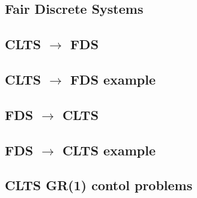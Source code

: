 \documentclass{article}
\begin{document}
\subsection{Fair Discrete Systems}


%

%

%

\subsection{CLTS $\rightarrow$ FDS}

\subsection{CLTS $\rightarrow$ FDS example}

%

\subsection{FDS $\rightarrow$ CLTS}


\subsection{FDS $\rightarrow$ CLTS example}


\subsection{CLTS GR(1) contol problems}

\end{document}

